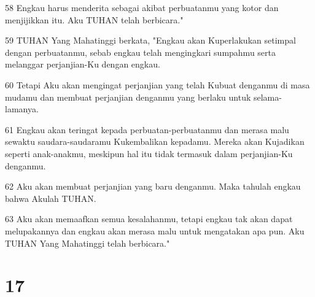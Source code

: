 \par 58 Engkau harus menderita sebagai akibat perbuatanmu yang kotor dan menjijikkan itu. Aku TUHAN telah berbicara."
\par 59 TUHAN Yang Mahatinggi berkata, "Engkau akan Kuperlakukan setimpal dengan perbuatanmu, sebab engkau telah mengingkari sumpahmu serta melanggar perjanjian-Ku dengan engkau.
\par 60 Tetapi Aku akan mengingat perjanjian yang telah Kubuat denganmu di masa mudamu dan membuat perjanjian denganmu yang berlaku untuk selama-lamanya.
\par 61 Engkau akan teringat kepada perbuatan-perbuatanmu dan merasa malu sewaktu saudara-saudaramu Kukembalikan kepadamu. Mereka akan Kujadikan seperti anak-anakmu, meskipun hal itu tidak termasuk dalam perjanjian-Ku denganmu.
\par 62 Aku akan membuat perjanjian yang baru denganmu. Maka tahulah engkau bahwa Akulah TUHAN.
\par 63 Aku akan memaafkan semua kesalahanmu, tetapi engkau tak akan dapat melupakannya dan engkau akan merasa malu untuk mengatakan apa pun. Aku TUHAN Yang Mahatinggi telah berbicara."

\chapter{17}


